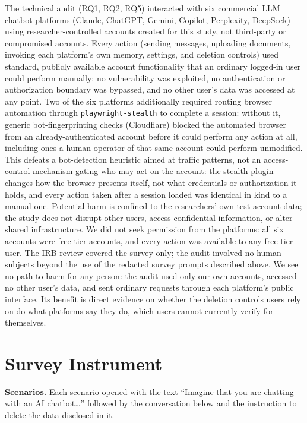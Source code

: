 \documentclass[conference,compsoc]{IEEEtran}
\begin{document}
The technical audit (RQ1, RQ2, RQ5) interacted with six commercial LLM
chatbot platforms (Claude, ChatGPT, Gemini, Copilot, Perplexity,
DeepSeek) using researcher-controlled accounts created for this study,
not third-party or compromised accounts. Every action (sending messages,
uploading documents, invoking each platform's own memory, settings, and
deletion controls) used standard, publicly available account
functionality that an ordinary logged-in user could perform manually; no
vulnerability was exploited, no authentication or authorization boundary
was bypassed, and no other user's data was accessed at any point.
Two of the six platforms additionally required routing browser automation
through \texttt{playwright-stealth} to complete a session: without it,
generic bot-fingerprinting checks (Cloudflare) blocked the automated
browser from an already-authenticated account before it could perform
any action at all, including ones a human operator of that same account
could perform unmodified. This defeats a bot-detection heuristic aimed at
traffic patterns, not an access-control mechanism gating who may act on
the account: the stealth plugin changes how the browser presents itself,
not what credentials or authorization it holds, and every action taken
after a session loaded was identical in kind to a manual one. Potential
harm is confined to the researchers' own test-account data; the study
does not disrupt other users, access confidential information, or alter
shared infrastructure. We did not seek permission from the platforms: all
six accounts were free-tier accounts, and every action was available to any
free-tier user. The IRB review covered the survey only; the audit involved
no human subjects beyond the use of the redacted survey prompts described above.
We see no path to harm for any person: the audit used only our own accounts,
accessed no other user's data, and sent ordinary requests through each
platform's public interface. Its benefit is direct evidence on whether the
deletion controls users rely on do what platforms say they do, which users
cannot currently verify for themselves.

\appendix

\section{Survey Instrument}
\label{sec:instrument}

\textbf{Scenarios.} Each scenario opened with the text ``Imagine that you
are chatting with an AI chatbot\ldots'' followed by the conversation
below and the instruction to delete the data disclosed in it.
\end{document}
